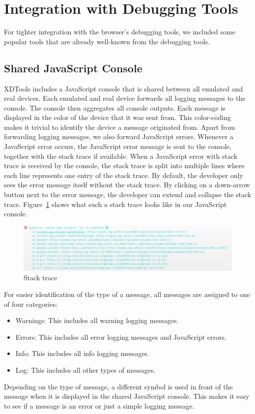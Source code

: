 \section{Integration with Debugging Tools}

For tighter integration with the browser's debugging tools, we included some popular tools that are already well-known from the debugging tools.

\subsection{Shared JavaScript Console}

XDTools includes a JavaScript console that is shared between all emulated and real devices. Each emulated and real device forwards all logging messages to the console. The console then aggregates all console outputs. Each message is displayed in the color of the device that it was sent from. This color-coding makes it trivial to identify the device a message originated from. Apart from forwarding logging messages, we also forward JavaScript errors. Whenever a JavaScript error occurs, the JavaScript error message is sent to the console, together with the stack trace if available. When a JavaScript error with stack trace is received by the console, the stack trace is split into multiple lines where each line represents one entry of the stack trace. By default, the developer only sees the error message itself without the stack trace. By clicking on a down-arrow button next to the error message, the developer can extend and collapse the stack trace. Figure~\ref{fig:stack_trace} shows what such a stack trace looks like in our JavaScript console.

\begin{figure}[H]
  \centering
    \includegraphics[width=1.0\textwidth]{images/screenshots/stack_trace.png}
	\caption[Screenshot: Stack trace]{Stack trace}
	\label{fig:stack_trace}
\end{figure}

For easier identification of the type of a message, all messages are assigned to one of four categories:
\begin{itemize}
	\item Warnings: This includes all warning logging messages.
	\item Errors: This includes all error logging messages and JavaScript errors.
	\item Info: This includes all info logging messages.
	\item Log: This includes all other types of messages.
\end{itemize}
Depending on the type of message, a different symbol is used in front of the message when it is displayed in the shared JavaScript console. This makes it easy to see if a message is an error or just a simple logging message.

